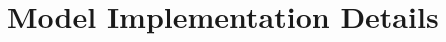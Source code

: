 \newpage
\appendix








\section{\methodname{} Model Implementation Details }
\label{sec:appen_lact_details}

